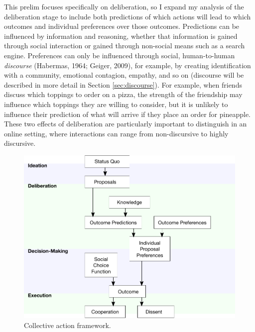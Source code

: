 This prelim focuses specifically on deliberation, so I expand my analysis of the deliberation stage to include both predictions of which actions will lead to which outcomes and individual preferences over those outcomes. Predictions can be influenced by information and reasoning, whether that information is gained through social interaction or gained through non-social means such as a search engine. Preferences can only be influenced through social, human-to-human {\em discourse} (Habermas, 1964; Geiger, 2009), for example, by creating identification with a community, emotional contagion, empathy, and so on (discourse will be described in more detail in Section \ref{sec:discourse}). For example, when friends discuss which toppings to order on a pizza, the strength of the friendship may influence which toppings they are willing to consider, but it is unlikely to influence their prediction of what will arrive if they place an order for pineapple. These two effects of deliberation are particularly important to distinguish in an online setting, where interactions can range from non-discursive to highly discursive.

\begin{figure}
\centering
\includegraphics[width=4.75in]{images/fig-framework.pdf}
\caption{
Collective action framework.\label{fig:framework}
}
\end{figure}

